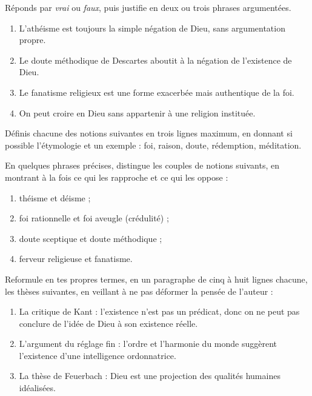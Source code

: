 \documentclass[11pt]{article}
\newcommand{\cle}[1]{{\popxbold\color{popdark}#1}}
\newcounter{popsec}
\newcounter{popsub}
\newcommand{\courssub}[1]{%
  \stepcounter{popsub}%
  \par\vspace{9pt}\noindent{\popxbold\fontsize{11.5}{13}\selectfont\color{popink}{\color{poporange}\thepopsec.\thepopsub}\hspace{6pt}#1}\par\nopagebreak\vspace{4pt}
}
\begin{document}
\begin{exercice}
Réponds par \emph{vrai} ou \emph{faux}, puis justifie en deux ou trois phrases argumentées.
\begin{enumerate}
\item L'athéisme est toujours la simple négation de Dieu, sans argumentation propre.
\item Le doute méthodique de Descartes aboutit à la négation de l'existence de Dieu.
\item Le fanatisme religieux est une forme exacerbée mais authentique de la foi.
\item On peut croire en Dieu sans appartenir à une religion instituée.
\end{enumerate}
\end{exercice}

\begin{exercice}[Définitions]
Définis chacune des notions suivantes en trois lignes maximum, en donnant si possible l'étymologie et un exemple : \cle{foi}, \cle{raison}, \cle{doute}, \cle{rédemption}, \cle{méditation}.
\end{exercice}

\begin{exercice}
En quelques phrases précises, distingue les couples de notions suivants, en montrant à la fois ce qui les rapproche et ce qui les oppose :
\begin{enumerate}
\item théisme et déisme ;
\item foi rationnelle et foi aveugle (crédulité) ;
\item doute sceptique et doute méthodique ;
\item ferveur religieuse et fanatisme.
\end{enumerate}
\end{exercice}

\courssub{Je m'entraîne}

\begin{exercice}
Reformule en tes propres termes, en un paragraphe de cinq à huit lignes chacune, les thèses suivantes, en veillant à ne pas déformer la pensée de l'auteur :
\begin{enumerate}
\item La critique de Kant : l'existence n'est pas un prédicat, donc on ne peut pas conclure de l'idée de Dieu à son existence réelle.
\item L'argument du réglage fin : l'ordre et l'harmonie du monde suggèrent l'existence d'une intelligence ordonnatrice.
\item La thèse de Feuerbach : Dieu est une projection des qualités humaines idéalisées.
\end{enumerate}
\end{exercice}
\end{document}
